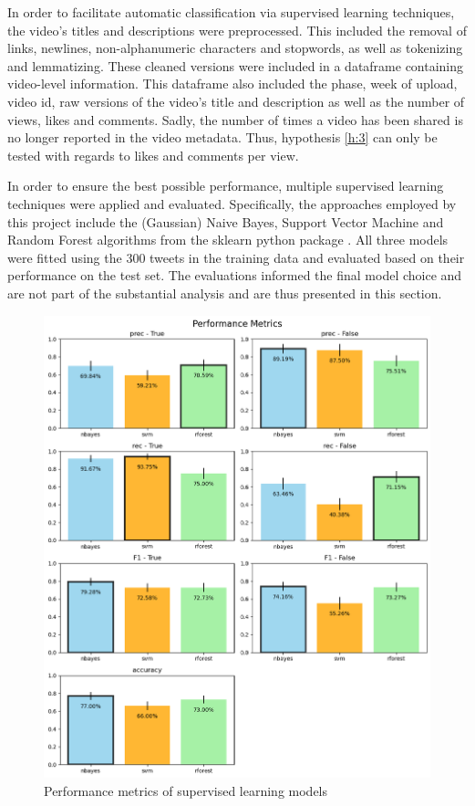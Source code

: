 \documentclass[fontsize=11pt, parskip=half]{scrartcl}
\begin{document}
    In order to facilitate automatic classification via supervised learning techniques, the video's titles and descriptions were preprocessed. This included the removal of links, newlines, non-alphanumeric characters and stopwords, as well as tokenizing and lemmatizing. These cleaned versions were included in a dataframe containing video-level information. This dataframe also included the phase, week of upload, video id, raw versions of the video's title and description as well as the number of views, likes and comments. Sadly, the number of times a video has been shared is no longer reported in the video metadata. Thus, hypothesis \ref{h:3} can only be tested with regards to likes and comments per view.

    In order to ensure the best possible performance, multiple supervised learning techniques were applied and evaluated. Specifically, the approaches employed by this project include the (Gaussian) Naive Bayes, Support Vector Machine and Random Forest algorithms from the sklearn python package \parencite{pedregosaScikitlearnMachineLearning2011}. All three models were fitted using the 300 tweets in the training data and evaluated based on their performance on the test set. The evaluations informed the final model choice and are not part of the substantial analysis and are thus presented in this section. 

    \begin{figure}
        \setlength\intextsep{0pt}
        \vspace{-10pt}
        \includegraphics[width=0.48 \textwidth]{img/labels_performance.png}
        \vspace{-5pt}
        \caption{Performance metrics of supervised learning models}
        \vspace{-10pt}
        \label{fig:performance}
    \end{figure}
\end{document}
